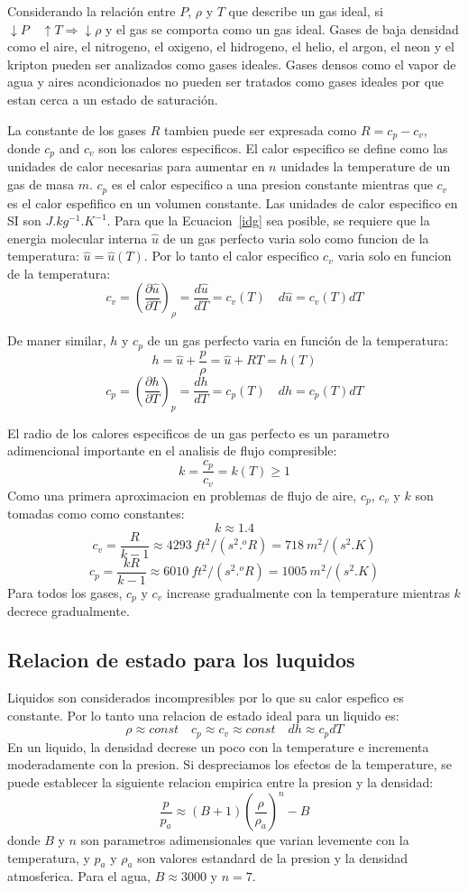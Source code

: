 \documentclass[10pt, oneside]{article}
\begin{document}
Considerando la relaci\'on entre $P$, $\rho$ y $T$ que describe un gas ideal, si $\downarrow P \quad \uparrow T \Rightarrow \downarrow \rho$ y el gas se comporta como un gas ideal. Gases de baja densidad como el aire, el nitrogeno, el oxigeno, el hidrogeno, el helio, el argon, el neon y el kripton pueden ser analizados como gases ideales. Gases densos como el vapor de agua y aires acondicionados no pueden ser tratados como gases ideales por que estan cerca a un estado de saturaci\'on.

La constante de los gases $R$ tambien puede ser expresada como $R=c_p - c_v$, donde $c_p$ and $c_v$ son los calores especificos. El calor especifico se define como las unidades de calor necesarias para aumentar en $n$ unidades la temperature de un gas de masa $m$. $c_p$ es el calor especifico a una presion constante mientras que $c_v$ es el calor espefifico en un volumen constante. Las unidades de calor especifico en SI son $J.kg^{-1}.K^{-1}$. Para que la Ecuacion~\ref{idg} sea posible, se requiere que la energia molecular interna $\hat{u}$ de un gas perfecto varia solo como funcion de la temperatura: $\hat{u}=\hat{u}(T)$. Por lo tanto el calor especifico $c_v$ varia solo en funcion de la temperatura:
$$
c_v=\left( \frac{\partial \hat{u}}{\partial T}\right)_{\rho} = \frac{d \hat{u}}{dT}=c_v (T) \quad d\hat{u} = c_v (T)dT
$$

De maner similar, $h$ y $c_p$ de un gas perfecto varia en funci\'on de la temperatura:
$$
h=\hat{u} + \frac{p}{\rho}=\hat{u}+RT=h(T)
$$
$$
c_p=\left( \frac{\partial h}{\partial T}\right)_{p} = \frac{d h}{dT}=c_p (T) \quad dh = c_p (T)dT
$$

El radio de los calores especificos de un gas perfecto es un parametro adimencional importante en el analisis de flujo compresible:
$$
k = \frac{c_p}{c_v}=k(T) \geq 1
$$
Como una primera aproximacion en problemas de flujo de aire, $c_p$, $c_v$ y $k$ son tomadas como como constantes:
$$
k\approx 1.4
$$
$$
c_v = \frac{R}{k-1} \approx 4293\ ft^2/(s^2 . ^oR) = 718\ m^2/(s^2 . K)
$$
$$
c_p = \frac{kR}{k-1} \approx 6010\ ft^2/(s^2 . ^oR) = 1005\ m^2/(s^2 . K)
$$
Para todos los gases, $c_p$ y $c_v$ increase gradualmente con la temperature mientras $k$ decrece gradualmente. 

\subsection{Relacion de estado para los luquidos}
Liquidos son considerados incompresibles por lo que su calor espefico es constante. Por lo tanto una relacion de estado ideal para un liquido es:
$$
\rho \approx const \quad c_p \approx c_v \approx const  \quad dh\approx c_p dT
$$
En un liquido, la densidad decrese un poco con la temperature e incrementa moderadamente con la presion. Si despreciamos los efectos de la temperature, se puede establecer la siguiente relacion empirica entre la presion y la densidad:
$$
\frac{p}{p_a}\approx (B+1) \left( \frac{\rho}{\rho_a} \right)^n - B
$$
donde $B$ y $n$ son parametros adimensionales que varian levemente con la temperatura, y $p_a$ y $\rho_a$ son valores estandard de la presion y la densidad atmosferica. Para el agua, $B\approx3000$ y $n=7$.
\end{document}

